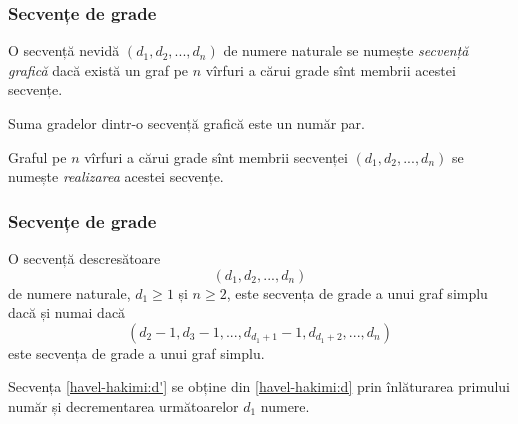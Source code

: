 \begin{frame}
  \frametitle{Secvențe de grade}

O secvență nevidă $(d_1,d_2,...,d_n)$ de numere naturale se numește \emph{secvență grafică} dacă există un graf pe $n$ vîrfuri a cărui grade sînt membrii acestei secvențe.

Suma gradelor dintr-o secvență grafică este un număr par.

Graful pe $n$ vîrfuri a cărui grade sînt membrii secvenței $(d_1,d_2,...,d_n)$ se numește \emph{realizarea} acestei secvențe.

\end{frame}

\begin{frame}
  \frametitle{Secvențe de grade}

\begin{theorem}
O secvență descresătoare 
\begin{equation}\label{havel-hakimi:d}
  (d_1,d_2,...,d_n)
\end{equation}
de numere naturale, $d_1\geq 1$ și $n\geq 2$, este secvența de grade a unui graf simplu dacă și numai dacă 
\begin{equation}\label{havel-hakimi:d'}
  (d_2-1,d_3-1,...,d_{d_1+1}-1,d_{d_1+2},...,d_n)
\end{equation}
este secvența de grade a unui graf simplu.
\end{theorem}

Secvența \eqref{havel-hakimi:d'} se obține din \eqref{havel-hakimi:d} prin înlăturarea primului număr și decrementarea următoarelor $d_1$ numere.

\end{frame}

